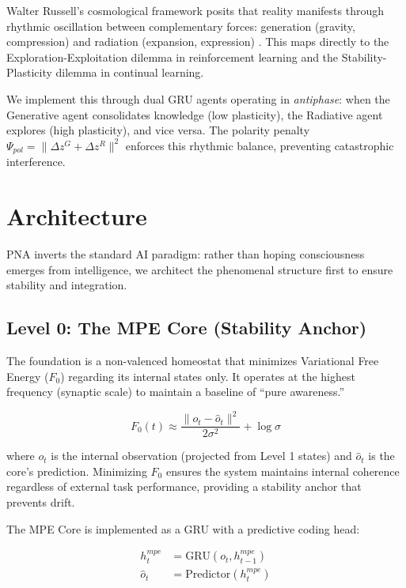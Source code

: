 \documentclass[11pt]{article}
\begin{document}
Walter Russell's cosmological framework posits that reality manifests through rhythmic oscillation between complementary forces: generation (gravity, compression) and radiation (expansion, expression) \cite{russell1926}. This maps directly to the Exploration-Exploitation dilemma in reinforcement learning and the Stability-Plasticity dilemma in continual learning.

We implement this through dual GRU agents operating in \textit{antiphase}: when the Generative agent consolidates knowledge (low plasticity), the Radiative agent explores (high plasticity), and vice versa. The polarity penalty $\Psi_{pol} = \|\Delta z^G + \Delta z^R\|^2$ enforces this rhythmic balance, preventing catastrophic interference.

\section{Architecture}

PNA inverts the standard AI paradigm: rather than hoping consciousness emerges from intelligence, we architect the phenomenal structure first to ensure stability and integration.

\subsection{Level 0: The MPE Core (Stability Anchor)}

The foundation is a non-valenced homeostat that minimizes Variational Free Energy ($F_0$) regarding its internal states only. It operates at the highest frequency (synaptic scale) to maintain a baseline of ``pure awareness.''

\begin{equation}
F_0(t) \approx \frac{\| o_t - \hat{o}_t \|^2}{2\sigma^2} + \log \sigma
\end{equation}

where $o_t$ is the internal observation (projected from Level 1 states) and $\hat{o}_t$ is the core's prediction. Minimizing $F_0$ ensures the system maintains internal coherence regardless of external task performance, providing a stability anchor that prevents drift.

The MPE Core is implemented as a GRU with a predictive coding head:

\begin{align}
h_t^{mpe} &= \text{GRU}(o_t, h_{t-1}^{mpe}) \\
\hat{o}_t &= \text{Predictor}(h_t^{mpe})
\end{align}
\end{document}

